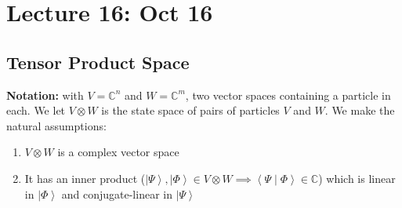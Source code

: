 \documentclass[12pt]{article}
\newcommand{\brak}[1]{\left\langle #1 \right\rangle}
\newcommand{\C}{\mathbb{C}}
\newcommand{\ket}[1]{\left\vert #1 \right\rangle}
\begin{document}
\section*{Lecture 16: Oct 16}
\subsection*{Tensor Product Space}
\textbf{Notation:} with $V = \C^n$ and $W = \C^m$, two vector spaces containing a particle in each. We let $V \otimes W$ is the state space of pairs of particles $V$ and $W$. We make the natural assumptions:
\begin{enumerate}
    \item $V \otimes W$ is a complex vector space 
    \item It has an inner product ($\ket \Psi, \ket \Phi \in V\otimes W \implies \brak{\Psi \; | \; \Phi} \in \C$) which is linear in $\ket \Phi$ and conjugate-linear in $\ket \Psi$
\end{enumerate}
\end{document}
